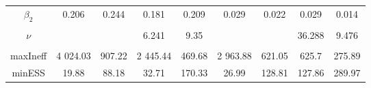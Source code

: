 \begin{footnotesize}
\begin{singlespace}
\begin{tabular}{ccccccccc}
$ \beta_{2} $ & 0.206 & 0.244 & 0.181 & 0.209 & 0.029 & 0.022 & 0.029 & 0.014 \\ 
 & \begin{tiny} [0.084,0.327] \end{tiny}  & \begin{tiny} [0.14,0.348] \end{tiny}  & \begin{tiny} [0.059,0.302] \end{tiny}  & \begin{tiny} [0.02,0.397] \end{tiny}  & \begin{tiny} [-0.039,0.1] \end{tiny}  & \begin{tiny} [-0.013,0.057] \end{tiny}  & \begin{tiny} [-0.043,0.098] \end{tiny}  & \begin{tiny} [-0.051,0.079] \end{tiny}  \\ 
$\nu$ &  &  & 6.241 & 9.35 &  &  & 36.288 & 9.476 \\ 
 &  &  & \begin{tiny} [4.4,8] \end{tiny}  & \begin{tiny} [8,10.7] \end{tiny}  &  &  & \begin{tiny} [29.6,43.8] \end{tiny}  & \begin{tiny} [8.8,10.1] \end{tiny}  \\  \midrule 
maxIneff & 4 024.03 &  907.22 & 2 445.44 &  469.68 & 2 963.88 &  621.05 &  625.7 &  275.89 \\ 
minESS & 19.88 & 88.18 & 32.71 &  170.33 & 26.99 &  128.81 &  127.86 &  289.97 \\\bottomrule 
\end{tabular}
\end{singlespace}
\end{footnotesize}

